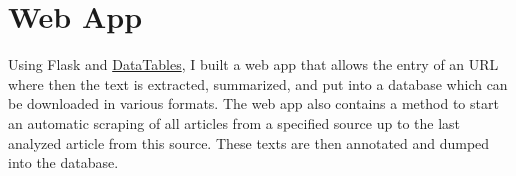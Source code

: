 \section{Web App}
  Using Flask and \href{https://www.datatables.net}{DataTables}, I built a web app that allows the entry of an URL where then the text is extracted, summarized, and put into a database which can be downloaded in various formats.
  The web app also contains a method to start an automatic scraping of all articles from a specified source up to the last analyzed article from this source. These texts are then annotated and dumped into the database.
